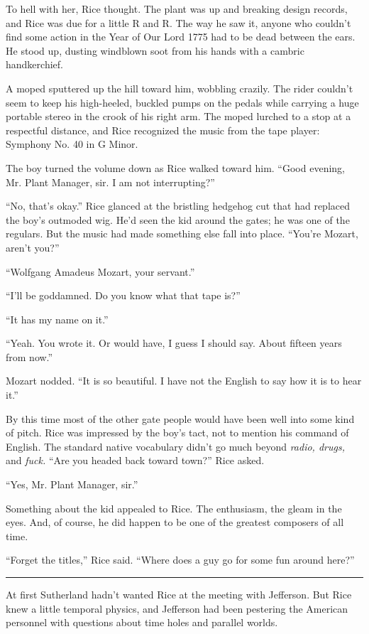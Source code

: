 To hell with her, Rice thought. The plant was up and breaking design records, and Rice was due for a little R and R. The way he saw it, anyone who couldn't find some action in the Year of Our Lord 1775 had to be dead between the ears. He stood up, dusting windblown soot from his hands with a cambric handkerchief.

A moped sputtered up the hill toward him, wobbling crazily. The rider couldn't seem to keep his high-heeled, buckled pumps on the pedals while carrying a huge portable stereo in the crook of his right arm. The moped lurched to a stop at a respectful distance, and Rice recognized the music from the tape player: Symphony No. 40 in G Minor.

The boy turned the volume down as Rice walked toward him. ``Good evening, Mr. Plant Manager, sir. I am not interrupting?''

``No, that's okay.'' Rice glanced at the bristling hedgehog cut that had replaced the boy's outmoded wig. He'd seen the kid around the gates; he was one of the regulars. But the music had made something else fall into place. ``You're Mozart, aren't you?''

``Wolfgang Amadeus Mozart, your servant.''

``I'll be goddamned. Do you know what that tape is?''

``It has my name on it.''

``Yeah. You wrote it. Or would have, I guess I should say. About fifteen years from now.''

Mozart nodded. ``It is so beautiful. I have not the English to say how it is to hear it.''

By this time most of the other gate people would have been well into some kind of pitch. Rice was impressed by the boy's tact, not to mention his command of English. The standard native vocabulary didn't go much beyond \textit{radio, drugs,} and \textit{fuck.} ``Are you headed back toward town?'' Rice asked.

``Yes, Mr. Plant Manager, sir.''

Something about the kid appealed to Rice. The enthusiasm, the gleam in the eyes. And, of course, he did happen to be one of the greatest composers of all time.

``Forget the titles,'' Rice said. ``Where does a guy go for some fun around here?''

\fancybreak{* * *}

At first Sutherland hadn't wanted Rice at the meeting with Jefferson. But Rice knew a little temporal physics, and Jefferson had been pestering the American personnel with questions about time holes and parallel worlds.


